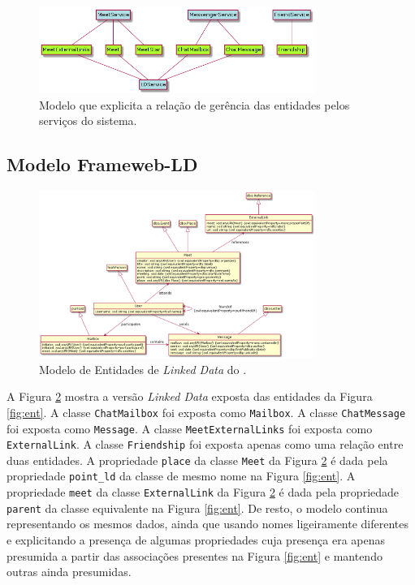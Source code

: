 \begin{figure}[H]
	\centering
	\includegraphics[width=0.8\textwidth]{figuras/entidade-servico-escrita.png}
	\caption{Modelo que explicita a relação de gerência das entidades pelos serviços do sistema.}
	\label{fig:ese}
\end{figure}

\subsection{Modelo Frameweb-LD}
\label{mfld}

\begin{figure}[H]
	\centering
	\includegraphics[width=0.8\textwidth]{figuras/framewebld.png}
	\caption{Modelo de Entidades de \textit{Linked Data} do \imprimirtitulo.}
	\label{fig:ld}
\end{figure}

A Figura \ref{fig:ld} mostra a versão \textit{Linked Data} exposta das entidades da Figura \ref{fig:ent}.
A classe \texttt{ChatMailbox} foi exposta como \texttt{Mailbox}.
A classe \texttt{ChatMessage} foi exposta como \texttt{Message}.
A classe \texttt{MeetExternalLinks} foi exposta como \texttt{ExternalLink}.
A classe \texttt{Friendship} foi exposta apenas como uma relação entre duas entidades.
A propriedade \texttt{place} da classe \texttt{Meet} da Figura \ref{fig:ld} é dada pela propriedade \texttt{point\_ld} da classe de mesmo nome na Figura \ref{fig:ent}.
A propriedade \texttt{meet} da classe \texttt{ExternalLink} da Figura \ref{fig:ld} é dada pela propriedade \texttt{parent} da classe equivalente na Figura \ref{fig:ent}.
De resto, o modelo continua representando os mesmos dados, ainda que usando nomes ligeiramente diferentes e explicitando a presença de algumas propriedades cuja presença era apenas presumida a partir das associações presentes na Figura \ref{fig:ent} e mantendo outras ainda presumidas.

%

